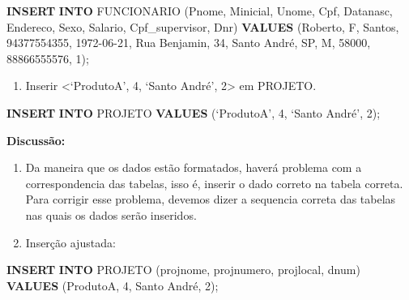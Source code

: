 \documentclass[
]{article}
\newenvironment{Shaded}{\begin{snugshade}}{\end{snugshade}}
\newcommand{\DecValTok}[1]{\textcolor[rgb]{0.00,0.00,0.81}{#1}}
\newcommand{\KeywordTok}[1]{\textcolor[rgb]{0.13,0.29,0.53}{\textbf{#1}}}
\newcommand{\NormalTok}[1]{#1}
\newcommand{\StringTok}[1]{\textcolor[rgb]{0.31,0.60,0.02}{#1}}
\providecommand{\tightlist}{%
  \setlength{\itemsep}{0pt}\setlength{\parskip}{0pt}}
\begin{document}
\begin{Shaded}
\begin{Highlighting}[]
\KeywordTok{INSERT} \KeywordTok{INTO}\NormalTok{ FUNCIONARIO }
\NormalTok{(Pnome, Minicial, Unome, Cpf, Datanasc, Endereco, Sexo, Salario, Cpf\_supervisor, Dnr) }
\KeywordTok{VALUES}\NormalTok{ (}\StringTok{\textquotesingle{}Roberto\textquotesingle{}}\NormalTok{, }\StringTok{\textquotesingle{}F\textquotesingle{}}\NormalTok{, }\StringTok{\textquotesingle{}Santos\textquotesingle{}}\NormalTok{, }\StringTok{\textquotesingle{}94377554355\textquotesingle{}}\NormalTok{, }\StringTok{\textquotesingle{}1972{-}06{-}21\textquotesingle{}}\NormalTok{, }
\StringTok{\textquotesingle{}Rua Benjamin, 34, Santo André, SP\textquotesingle{}}\NormalTok{, }\StringTok{\textquotesingle{}M\textquotesingle{}}\NormalTok{, }\DecValTok{58000}\NormalTok{, }\StringTok{\textquotesingle{}88866555576\textquotesingle{}}\NormalTok{, }\DecValTok{1}\NormalTok{);}
\end{Highlighting}
\end{Shaded}

\begin{enumerate}
\def\labelenumi{\arabic{enumi}.}
\setcounter{enumi}{1}
\tightlist
\item
  Inserir \textless{}`ProdutoA', 4, `Santo André', 2\textgreater{} em
  PROJETO.
\end{enumerate}

\begin{Shaded}
\begin{Highlighting}[]
\KeywordTok{INSERT} \KeywordTok{INTO}\NormalTok{ PROJETO }\KeywordTok{VALUES}\NormalTok{ (‘ProdutoA’, }\DecValTok{4}\NormalTok{, ‘Santo André’, }\DecValTok{2}\NormalTok{);}
\end{Highlighting}
\end{Shaded}

\textbf{Discussão:}

\begin{enumerate}
\def\labelenumi{\roman{enumi}.}
\item
  Da maneira que os dados estão formatados, haverá problema com a
  correspondencia das tabelas, isso é, inserir o dado correto na tabela
  correta. Para corrigir esse problema, devemos dizer a sequencia
  correta das tabelas nas quais os dados serão inseridos.
\item
  Inserção ajustada:
\end{enumerate}

\begin{Shaded}
\begin{Highlighting}[]
\KeywordTok{INSERT} \KeywordTok{INTO}\NormalTok{ PROJETO (projnome, projnumero, projlocal, dnum) }\KeywordTok{VALUES} 
\NormalTok{(}\StringTok{\textquotesingle{}ProdutoA\textquotesingle{}}\NormalTok{, }\DecValTok{4}\NormalTok{, }\StringTok{\textquotesingle{}Santo André\textquotesingle{}}\NormalTok{, }\DecValTok{2}\NormalTok{);}
\end{Highlighting}
\end{Shaded}
\end{document}
